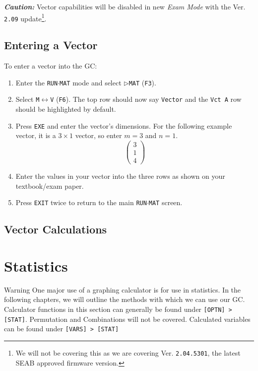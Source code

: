 \documentclass[a5paper,draft]{memoir}
\def\code#1{\texttt{#1}}
\def\caution#1{\textbf{\textit{Caution:}} #1}
\def\runmat{\code{RUN$\cdot$MAT} }
\def\fthree{(\code{F3})}
\def\fsix{(\code{F6})}
\begin{document}
\caution{Vector capabilities will be disabled in new \textit{Exam Mode} with the Ver. \code{2.09} update\footnote{We will not be covering this as we are covering Ver. \code{2.04.5301}, the latest SEAB approved firmware version.}.}

\section{Entering a Vector}

To enter a vector into the GC:

\begin{enumerate}
	\item Enter the \runmat mode and select \code{$\triangleright$MAT} \fthree.
	\item Select \code{M$\leftrightarrow$V} \fsix. The top row should now say \code{Vector} and the \code{Vct A} row should be highlighted by default.
	\item Press \code{EXE} and enter the vector's dimensions. For the following example vector, it is a $3\times1$ vector, so enter $m=3$ and $n=1$. 
	\begin{equation*}
		\left(
			\begin{array}{c}
				3 \\  
				1 \\
				4 
			\end{array}
		\right)
	\end{equation*}
	\item Enter the values in your vector into the three rows as shown on your textbook/exam paper.
	\item Press \code{EXIT} twice to return to the main \runmat screen.
	
\end{enumerate}

\section{Vector Calculations}

\chapter{Statistics}Warning
One major use of a graphing calculator is for use in statistics. In the following chapters, we will outline the methods with which we can use our GC. Calculator functions in this section can generally be found under \code{[OPTN] > [STAT]}. Permutation and Combinations will not be covered. Calculated variables can be found under \code{[VARS] > [STAT]}
\end{document}
